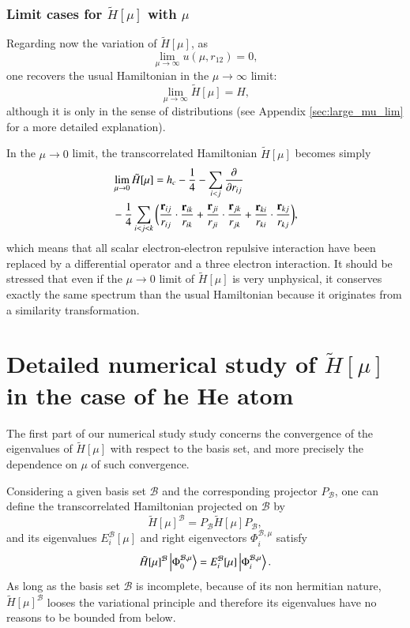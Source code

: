 \documentclass[aip,jcp,reprint,noshowkeys,superscriptaddress]{revtex4-1}
\newcommand{\deriv}[3]{\frac{\partial^{#3} #1}{\partial {#2}^{#3}}}
\newcommand{\bri}[1]{{\bf r}_{#1}}
\newcommand{\phimub}[0]{\Phi^{\mathcal{B},\mu}_0}
\newcommand{\phiimub}[0]{\Phi^{\mathcal{B},\mu}_i}
\newcommand{\basis}[0]{\mathcal{B}}
\begin{document}
\subsubsection{Limit cases for $\tilde{H}[\mu]$ with $\mu$}
\label{sec:h_mu_lim}
Regarding now the variation of $\tilde{H}[\mu]$, as 
\begin{equation}
 \label{eq:lim_mu_0}
 \lim_{\mu  \rightarrow \infty }u(\mu,r_{12}) = 0, 
\end{equation}
one recovers the usual Hamiltonian in the ${\mu  \rightarrow \infty }$ limit:
\begin{equation}
 \label{eq:lim_mu_1}
 \lim_{\mu \rightarrow \infty} \tilde{H}[\mu] = H,
\end{equation}
although it is only in the sense of distributions (see Appendix \ref{sec:large_mu_lim} for a more detailed explanation). 

In the $\mu \rightarrow 0$ limit, the transcorrelated Hamiltonian $\tilde{H}[\mu]$ becomes simply 
\begin{equation}
 \label{eq:htilde_mu_low}
 \begin{aligned}
&\lim_{\mu \rightarrow 0} \tilde{H}[\mu] = h_c - \frac{1}{4} - \sum_{i<j}\deriv{}{r_{ij}}{} \\
 & - \frac{1}{4}\sum_{i<j<k}  \bigg(\frac{\bri{ij} }{ r_{ij}} \cdot \frac{\bri{ik} }{ r_{ik}} + \frac{\bri{ji} }{ r_{ji}} \cdot \frac{\bri{jk}  }{ r_{jk}} + \frac{\bri{ki} }{ r_{ki}} \cdot  \frac{\bri{kj} }{ r_{kj}} \bigg),
 \end{aligned}
\end{equation}
which means that all scalar electron-electron repulsive interaction have been replaced by a differential operator and a three electron interaction. 
It should be stressed that even if the $\mu \rightarrow 0$ limit of $\tilde{H}[\mu]$ is very unphysical, it conserves exactly the same spectrum than the usual Hamiltonian because it originates from a similarity transformation. 

\section{Detailed numerical study of $\tilde{H}[\mu]$ in the case of he He atom}
\label{sec:total_he}
The first part of our numerical study study concerns the convergence of the eigenvalues of $\tilde{H}[\mu]$ with respect to the basis set, and more precisely the dependence on $\mu$ of such convergence. 

Considering a given basis set $\basis$ and the corresponding projector $P_\basis$, one can define the transcorrelated Hamiltonian projected on $\basis$ by
\begin{equation}
 \tilde{H}[\mu]^{\basis} = P_\basis \tilde{H}[\mu] P_\basis,
\end{equation}
and its eigenvalues $E_i^{\basis}[\mu]$ and right eigenvectors $\phiimub$ satisfy 
\begin{equation}
 \tilde{H}[\mu]^{\basis} \ket{\phimub} = E_i^{\basis}[\mu] \ket{\phiimub}. 
\end{equation}
As long as the basis set $\basis$ is incomplete, because of its non hermitian nature, $\tilde{H}[\mu]^{\basis}$ looses the variational principle and therefore its eigenvalues have no reasons to be bounded from below.  
\end{document}
